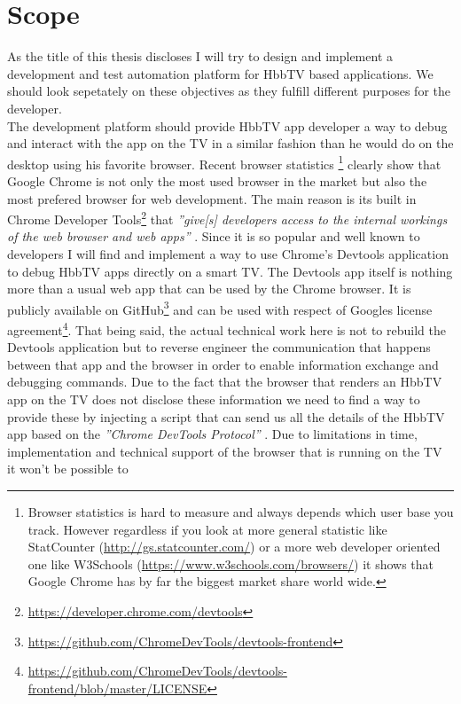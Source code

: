 \section{Scope\label{sec:scope}}

As the title of this thesis discloses I will try to design and implement a development and test automation
platform for HbbTV based applications. We should look sepetately on these objectives as they fulfill different
purposes for the developer.\\
The development platform should provide HbbTV app developer a way to debug and interact with the app on the
TV in a similar fashion than he would do on the desktop using his favorite browser. Recent browser statistics
\footnote{Browser statistics is hard to measure and always depends which user base you track. However regardless
if you look at more general statistic like StatCounter (\url{http://gs.statcounter.com/}) or a more web developer
oriented one like W3Schools (\url{https://www.w3schools.com/browsers/}) it shows that Google Chrome has by far
the biggest market share world wide.} clearly show that Google Chrome is not only the most used browser in the
market but also the most prefered browser for web development. The main reason is its built in Chrome Developer
Tools\footnote{\url{https://developer.chrome.com/devtools}} that \textit{''give[s] developers access to the internal
workings of the web browser and web apps''} \cite{devtools}. Since it is so popular and well known to developers
I will find and implement a way to use Chrome's Devtools application to debug HbbTV apps directly on a smart TV.
The Devtools app itself is nothing more than a usual web app that can be used by the Chrome browser. It is
publicly available on GitHub\footnote{\url{https://github.com/ChromeDevTools/devtools-frontend}} and can be used
with respect of Googles license agreement\footnote{\url{https://github.com/ChromeDevTools/devtools-frontend/blob/master/LICENSE}}.
That being said, the actual technical work here is not to rebuild the Devtools application but to reverse
engineer the communication that happens between that app and the browser in order to enable information exchange
and debugging commands. Due to the fact that the browser that renders an HbbTV app on the TV does not disclose
these information we need to find a way to provide these by injecting a script that can send us all the details
of the HbbTV app based on the \textit{''Chrome DevTools Protocol''} \cite{devtoolsprotocol}. Due to limitations
in time, implementation and technical support of the browser that is running on the TV it won't be possible to
